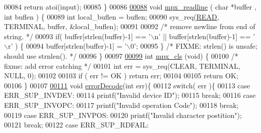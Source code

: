\begin{DoxyCode}
{{00084         \textcolor{keywordflow}{return} atoi(input);
00085 \}
00086 
\hypertarget{mpx__util_8c_source_l00088}{}\hyperlink{mpx__util_8h_a781169ab05ad54c0d37253d73060b77f}{00088} \textcolor{keywordtype}{void} \hyperlink{mpx__util_8c_a781169ab05ad54c0d37253d73060b77f}{mpx_readline} ( \textcolor{keywordtype}{char} *buffer , \textcolor{keywordtype}{int} buflen  ) \{
00089         \textcolor{keywordtype}{int} local\_buflen = buflen;
00090         sys\_req(\hyperlink{_m_p_x___r5_8h_ada74e7db007a68e763f20c17f2985356}{READ}, TERMINAL, buffer, &local\_buflen);
00091 
00092         \textcolor{comment}{/* remove newline from end of string. */}
00093         \textcolor{keywordflow}{if}( buffer[strlen(buffer)-1] == \textcolor{charliteral}{'\(\backslash\)n'} || buffer[strlen(buffer)-1] == \textcolor{charliteral}{'\(\backslash\)r'} 
      ) \{
00094                 buffer[strlen(buffer)-1] = \textcolor{charliteral}{'\(\backslash\)0'};
00095         \} \textcolor{comment}{/* FIXME: strlen() is unsafe; should use strnlen(). */}
00096 \}
00097 
\hypertarget{mpx__util_8c_source_l00099}{}\hyperlink{mpx__util_8h_a8cf3281978ba1652fd5d643e1a41f70b}{00099} \textcolor{keywordtype}{int} \hyperlink{mpx__util_8c_a8cf3281978ba1652fd5d643e1a41f70b}{mpx_cls} (\textcolor{keywordtype}{void}) \{
00100         \textcolor{comment}{/* fixme: add error catching */}
00101         \textcolor{keywordtype}{int} err = sys\_req(CLEAR, TERMINAL, NULL, 0);
00102         
00103         \textcolor{keywordflow}{if} ( err != OK ) \textcolor{keywordflow}{return} err;
00104         
00105         \textcolor{keywordflow}{return} OK;
00106 \}
00107 
\hypertarget{mpx__util_8c_source_l00111}{}\hyperlink{mpx__util_8h_a849eaf878bb59c0ed185a00d281047e9}{00111} \textcolor{keywordtype}{void} \hyperlink{mpx__util_8c_a849eaf878bb59c0ed185a00d281047e9}{errorDecode}(\textcolor{keywordtype}{int} err)\{
00112         \textcolor{keywordflow}{switch}( err )\{
00113                 \textcolor{keywordflow}{case} ERR\_SUP\_INVDEV:
00114                         printf(\textcolor{stringliteral}{"Invalid device ID"});
00115                         \textcolor{keywordflow}{break};
00116                 \textcolor{keywordflow}{case} ERR\_SUP\_INVOPC:
00117                         printf(\textcolor{stringliteral}{"Invalid operation Code"});
00118                         \textcolor{keywordflow}{break};
00119                 \textcolor{keywordflow}{case} ERR\_SUP\_INVPOS:
00120                         printf(\textcolor{stringliteral}{"Invalid character postition"});
00121                         \textcolor{keywordflow}{break};
00122                 \textcolor{keywordflow}{case} ERR\_SUP\_RDFAIL:
}}
\end{DoxyCode}

